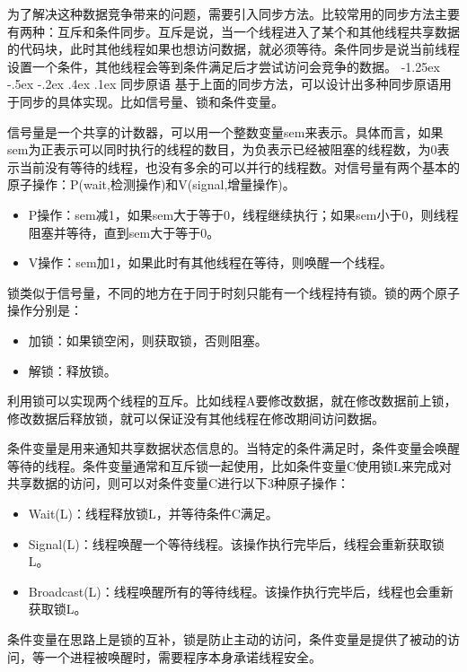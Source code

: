 \documentclass[a4paper, 11pt]{ctexart}
\makeatletter
\newcommand{\xiaosihao}{\fontsize{12pt}{\baselineskip}\selectfont}
\renewcommand\subsection{\@startsection{subsection}{1}{\z@}%
{-1.25ex \@plus -.5ex \@minus -.2ex}%
{.4ex \@plus .1ex}%
{\normalfont\xiaosihao\CJKfamily{hei}}}
\makeatother
\begin{document}
为了解决这种数据竞争带来的问题，需要引入同步方法。比较常用的同步方法主要有两种：互斥和条件同步。互斥是说，当一个线程进入了某个和其他线程共享数据的代码块，此时其他线程如果也想访问数据，就必须等待。条件同步是说当前线程设置一个条件，其他线程会等到条件满足后才尝试访问会竞争的数据。
\subsection{同步原语}
基于上面的同步方法，可以设计出多种同步原语用于同步的具体实现。比如信号量、锁和条件变量。

信号量是一个共享的计数器，可以用一个整数变量sem来表示。具体而言，如果sem为正表示可以同时执行的线程的数目，为负表示已经被阻塞的线程数，为0表示当前没有等待的线程，也没有多余的可以并行的线程数。对信号量有两个基本的原子操作：P(wait,检测操作)和V(signal,增量操作)。
\begin{itemize}
    \item P操作：sem减1，如果sem大于等于0，线程继续执行；如果sem小于0，则线程阻塞并等待，直到sem大于等于0。
    \item V操作：sem加1，如果此时有其他线程在等待，则唤醒一个线程。
\end{itemize}

锁类似于信号量，不同的地方在于同于时刻只能有一个线程持有锁。锁的两个原子操作分别是：
\begin{itemize}
    \item 加锁：如果锁空闲，则获取锁，否则阻塞。
    \item 解锁：释放锁。
\end{itemize}

利用锁可以实现两个线程的互斥。比如线程A要修改数据，就在修改数据前上锁，修改数据后释放锁，就可以保证没有其他线程在修改期间访问数据。

条件变量是用来通知共享数据状态信息的。当特定的条件满足时，条件变量会唤醒等待的线程。条件变量通常和互斥锁一起使用，比如条件变量C使用锁L来完成对共享数据的访问，则可以对条件变量C进行以下3种原子操作：
\begin{itemize}
    \item Wait(L)：线程释放锁L，并等待条件C满足。
    \item Signal(L)：线程唤醒一个等待线程。该操作执行完毕后，线程会重新获取锁L。
    \item Broadcast(L)：线程唤醒所有的等待线程。该操作执行完毕后，线程也会重新获取锁L。
\end{itemize}

条件变量在思路上是锁的互补，锁是防止主动的访问，条件变量是提供了被动的访问，等一个进程被唤醒时，需要程序本身承诺线程安全。
\end{document}
